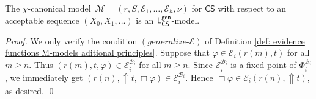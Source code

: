 \documentclass[envcountsect,envcountsame,oribibl,orivec]{llncs}
\newcommand{\Prop}{\textsf{Prop}}
\newcommand{\Formulae}{\textsf{Fml}}
\newcommand{\lalways}{\Box}
\newcommand{\LPLTLp}{\textsf{LPLTL}^{\sf P}}
\newcommand{\Terms}{\textsf{Tm}}
\newcommand{\jbox}[1]{\left[#1\right]\!}
\newcommand{\tgeneralize}{\Uparrow}
\newcommand{\CS}{\textsf{CS}}
\newcommand{\numberofagents}{h}
\newcommand{\generalizeprinciple}{\ensuremath{(\textsf{generalize})}}
\newcommand{\generalizeevidence}{\ensuremath{(generalize\text{-}\evidence)}}
\newcommand{\evidence}{\mathcal{E}}
\newcommand{\valuation}{\nu}
\newcommand{\M}{\mathcal{M}}
\newcommand{\N}{\mathbb{N}}
\renewcommand{\phi}{\varphi}
\newcommand{\MCS}{\mathsf{MCS}}
\newcommand{\B}{\mathcal{B}}
\newcommand{\Op}[1]{\Phi^{#1}}
\begin{document}
%	
%		
%		
%		
%	
%	

\begin{lemma}
	The $\chi$-canonical  model~$\M = (r,S,\evidence_1,\ldots,\evidence_\numberofagents, \valuation)$ for $\CS$ with respect to an acceptable sequence $(X_0, X_1, \ldots)$ is an ${\sf L}^{\sf gen}_\CS$-model.
\end{lemma}
\begin{proof}
	We only verify the condition $\generalizeevidence$ of Definition \ref{def: evidence functions M-models aditional principles}.
	Suppose that 
	$\phi \in \evidence_i(r(m),t)$ for all $m \geq n$. Thus $(r(m), t, \phi) \in \evidence_i^{\mathcal{B}_i}$  for all $m \geq n$.
	Since $\evidence_i^{\mathcal{B}_i}$ is a fixed point of $\Op{\mathcal{B}_i}_i$, we immediately get
	$(r(n), \tgeneralize t, \lalways \phi) \in \evidence_i^{\mathcal{B}_i}$. Hence $\lalways \phi \in \evidence_i(r(n),\tgeneralize t)$, as desired. \qed
\end{proof}
\end{document}
